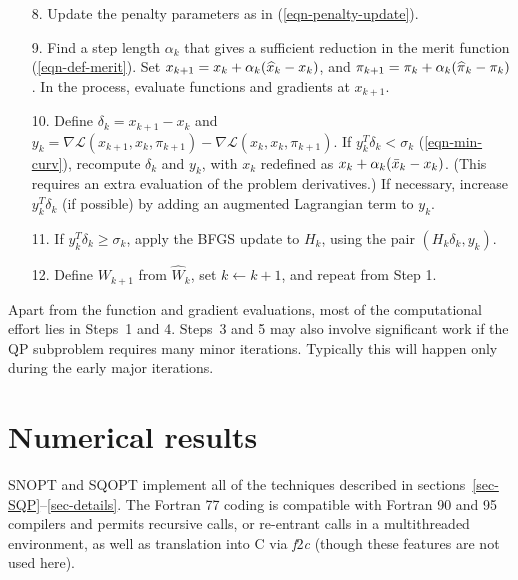 \documentclass[draft,leqno,onefignum,onetabnum]{siamltex}
\def\grad{\nabla}
\def\kp#1{_{k+#1}}
\def\Lscr{{\mathcal L}}
\def\pihat{\skew1\widehat \pi}
\def\T{^T\!}
\def\What{\widehat W}
\def\xbar{\skew{2.8}\bar x}
\def\xhat{\skew{2.8}\widehat x}
\def\L {\Lscr}                    %
\def\SNOPT {{\small SNOPT}}
\def\SQOPT {{\small SQOPT}}
\begin{document}
\begin{enumerate}
\item[8.] Update the penalty parameters as in (\ref{eqn-penalty-update}).

\item[9.]  Find a step length $\alpha_k$ that gives a sufficient
reduction in the merit function (\ref{eqn-def-merit}).  Set
$  x\kp1 =   x_k + \alpha_k ( \xhat_k -   x_k)$, and
$\pi\kp1 = \pi_k + \alpha_k (\pihat_k - \pi_k)$.
In the process, evaluate functions and gradients at $x\kp1$.

\item[10.] Define $\delta_k = x\kp1 - x_k$ and $y_k =
\grad\L(x\kp1,x_k,\pi\kp1) - \grad\L(x_k,x_k,\pi\kp1)$.  If
$y_k\T\delta_k < \sigma_k$ (\ref{eqn-min-curv}),
recompute $\delta_k$ and $y_k$, with $x_k$
redefined as $x_k + \alpha_k (\xbar_k - x_k)$. (This requires an extra
evaluation of the problem derivatives.)  If necessary, increase $y_k\T
\delta_k$ (if possible) by adding an augmented Lagrangian term to
$y_k$.

\item[11.] If $y_k\T \delta_k \ge \sigma_k$, apply the BFGS update
to $H_k$, using the  pair
$(H_k\delta_k,y_k)$.

 \item[12.] Define $W\kp1$ from $\What_k$, set $k \gets k+1$,
and repeat from Step 1.
\end{enumerate}

\smallskip \noindent
Apart from the function and gradient evaluations,
most of the computational effort lies in Steps~1 and 4.  Steps~3 and 5
may also involve significant work if the QP subproblem requires many
minor iterations. Typically this will happen only during the early
major iterations.


 \section{Numerical results} \label{sec-results}

\SNOPT{} and \SQOPT{} implement all of the techniques described
in sections~\ref{sec-SQP}--\ref{sec-details}.  The Fortran 77 coding
is compatible with Fortran 90 and 95 compilers and permits recursive calls,
or re-entrant calls in a multithreaded environment, as well as translation
into C via \textit{f}2\textit{c} \cite{f2c} (though these features are not used here).
\end{document}
